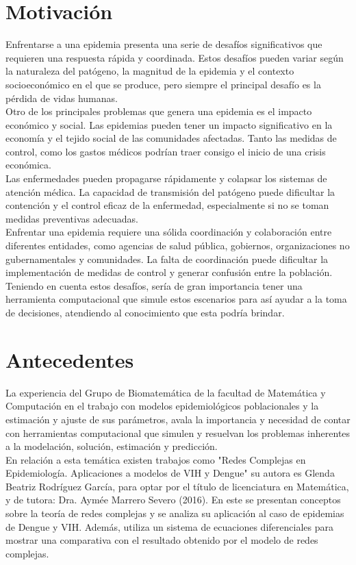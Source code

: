 \section{Motivación}
Enfrentarse a una epidemia presenta una serie de desafíos significativos que requieren 
una respuesta rápida y coordinada. Estos desafíos pueden variar según la naturaleza del 
patógeno, la magnitud de la epidemia y el contexto socioeconómico en el que se produce, 
pero siempre el principal desafío es la pérdida de vidas humanas.\\
Otro de los principales problemas que genera una epidemia es el impacto económico y social. 
Las epidemias pueden tener un impacto significativo en la economía y el tejido social 
de las comunidades afectadas. Tanto las medidas de control, como los gastos médicos podrían 
traer consigo el inicio de una crisis económica.\\
Las enfermedades pueden propagarse rápidamente y colapsar los sistemas de atención 
médica. La capacidad de transmisión del patógeno puede dificultar la contención y el control 
eficaz de la enfermedad, especialmente si no se toman medidas preventivas adecuadas.\\
Enfrentar una epidemia requiere una sólida coordinación y colaboración entre diferentes 
entidades, como agencias de salud pública, gobiernos, organizaciones no gubernamentales y 
comunidades. La falta de coordinación puede dificultar la implementación de medidas de 
control y generar confusión entre la población.\\
Teniendo en cuenta estos desafíos, sería de gran importancia tener una herramienta 
computacional que simule estos escenarios para así ayudar a la toma de decisiones, atendiendo 
al conocimiento que esta podría brindar.\\

\section{Antecedentes}
La experiencia del Grupo de Biomatemática de la facultad de Matemática y Computación en el trabajo 
con modelos epidemiológicos poblacionales y la estimación y ajuste de sus parámetros, avala la 
importancia y necesidad de contar con herramientas computacional que simulen y resuelvan los problemas 
inherentes a la modelación, solución, estimación y predicción.\\
En relación a esta temática existen trabajos como "Redes Complejas en Epidemiología. Aplicaciones a 
modelos de VIH y Dengue" su autora es Glenda Beatriz Rodríguez García, para optar por el título 
de licenciatura en Matemática, y de tutora: Dra. Aymée Marrero Severo (2016). En este se presentan
conceptos sobre la teoría de redes complejas y se analiza su aplicación al caso de epidemias de Dengue
y VIH. Además, utiliza un sistema de ecuaciones diferenciales para mostrar una comparativa con el 
resultado obtenido por el modelo de redes complejas.\\ 

